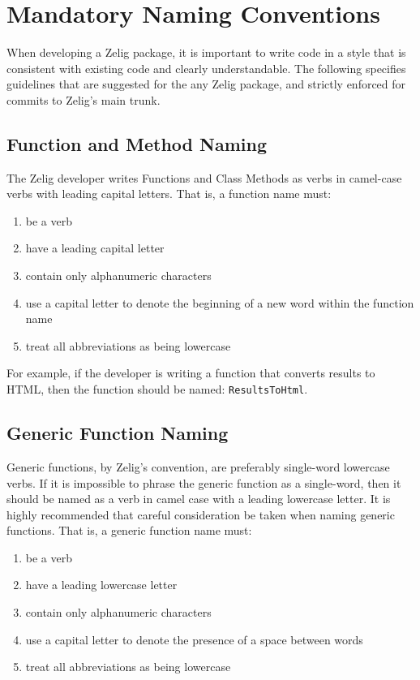 \section{Mandatory Naming Conventions}
When developing a Zelig package, it is important to write code in a style that is consistent with existing code and clearly understandable.  The following specifies guidelines that are suggested for the any Zelig package, and strictly enforced for commits to Zelig's main trunk.


\subsection{Function and Method Naming}
The Zelig developer writes Functions and Class Methods as verbs in camel-case verbs with leading capital letters.  That is, a function name must:

{\tt\begin{enumerate}
	\item{be a verb}
	\item{have a leading capital letter}
	\item{contain only alphanumeric characters}
	\item{use a capital letter to denote the beginning of a new word within the function name}
	\item{treat all abbreviations as being lowercase}
\end{enumerate}}

For example, if the developer is writing a function that converts results to HTML, then the function should be named: {\tt ResultsToHtml}.



\subsection{Generic Function Naming}
Generic functions, by Zelig's convention, are preferably single-word lowercase verbs.  If it is impossible to phrase the generic function as a single-word, then it should be named as a verb in camel case with a leading lowercase letter.  It is highly recommended that careful consideration be taken when naming generic functions.  That is, a generic function name must:

{\tt\begin{enumerate}
	\item{be a verb}
	\item{have a leading lowercase letter}
	\item{contain only alphanumeric characters}
	\item{use a capital letter to denote the presence of a space between words}
	\item{treat all abbreviations as being lowercase}
\end{enumerate}}


